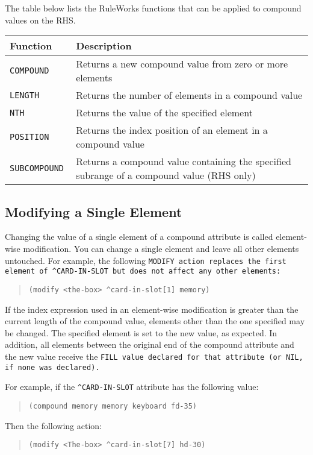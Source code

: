 The table below lists the RuleWorks functions that can be applied to
compound values on the RHS.

\begin{tabularx}{\columnwidth}{lX}
  \toprule
  Function & Description \\
  \midrule
  \tt{COMPOUND} & Returns a new compound value 
                  from zero or more elements \\
  \tt{LENGTH} & Returns the number of elements
                in a compound value \\
  \tt{NTH} & Returns the value of the specified element \\
  \tt{POSITION} & Returns the index position of 
                  an element in a compound value \\
  \tt{SUBCOMPOUND} & Returns a compound value containing 
                     the specified subrange of a
                     compound value (RHS only) \\
  \bottomrule
\end{tabularx}

\subsection{Modifying a Single Element}

Changing the value of a single element of a compound attribute is
called element-wise modification. You can change a single element and
leave all other elements untouched. For example, the following
\tt{MODIFY} action replaces the first element of \verb|^CARD-IN-SLOT|
but does not affect any other elements:
\begin{quote}
\begin{verbatim}
(modify <the-box> ^card-in-slot[1] memory)
\end{verbatim}
\end{quote}
If the index expression used in an element-wise modification is
greater than the current length of the compound value, elements other
than the one specified may be changed.  The specified element is set
to the new value, as expected. In addition, all elements between the
original end of the compound attribute and the new value receive the
\tt{FILL} value declared for that attribute (or \tt{NIL}, if none was
declared).

For example, if the \verb|^CARD-IN-SLOT| attribute
has the following value:
\begin{quote}
\begin{verbatim}
(compound memory memory keyboard fd-35)
\end{verbatim}
\end{quote}
Then the following action:
\begin{quote}
\begin{verbatim}
(modify <The-box> ^card-in-slot[7] hd-30)
\end{verbatim}
\end{quote}

